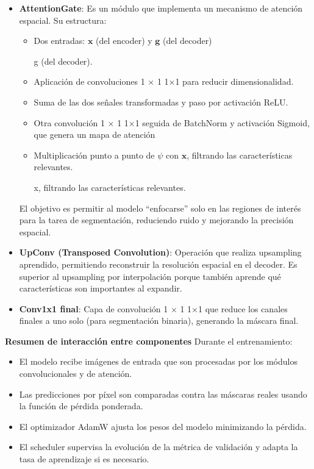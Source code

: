 \begin{enumerate}
\begin{itemize}
\begin{itemize}
\item \textbf{AttentionGate}:
Es un módulo que implementa un mecanismo de atención espacial. Su estructura:
\begin{itemize}
\item Dos entradas: 
$\mathbf{x}$ (del encoder) y $\mathbf{g}$ (del decoder)

g (del decoder).
\item Aplicación de convoluciones 
1
×
1
1×1 para reducir dimensionalidad.
\item Suma de las dos señales transformadas y paso por activación ReLU.
\item Otra convolución 
1
×
1
1×1 seguida de BatchNorm y activación Sigmoid, que genera un mapa de atención 
\item Multiplicación punto a punto de $\psi$ con $\mathbf{x}$, filtrando las características relevantes.

x, filtrando las características relevantes.
\end{itemize}
El objetivo es permitir al modelo “enfocarse” solo en las regiones de interés para la tarea de segmentación, reduciendo ruido y mejorando la precisión espacial.

\item \textbf{UpConv (Transposed Convolution)}:
Operación que realiza upsampling aprendido, permitiendo reconstruir la resolución espacial en el decoder. Es superior al upsampling por interpolación porque también aprende qué características son importantes al expandir.

\item \textbf{Conv1x1 final}:
Capa de convolución 
1
×
1
1×1 que reduce los canales finales a uno solo (para segmentación binaria), generando la máscara final.
\end{itemize}



\textbf{Resumen de interacción entre componentes}
Durante el entrenamiento:
\begin{itemize}
\item El modelo recibe imágenes de entrada que son procesadas por los módulos convolucionales y de atención.
\item Las predicciones por píxel son comparadas contra las máscaras reales usando la función de pérdida ponderada.
\item El optimizador AdamW ajusta los pesos del modelo minimizando la pérdida.
\item El scheduler supervisa la evolución de la métrica de validación y adapta la tasa de aprendizaje si es necesario.
\end{itemize}


\end{itemize}
\end{enumerate}
